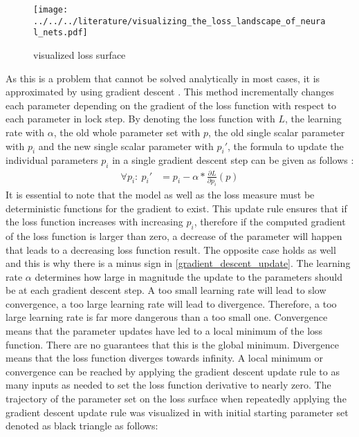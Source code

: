 \documentclass[draft,final]{vutinfth} %
\begin{document}
    \begin{figure}[H]
        \centering{}
        \texttt{[image: ../../../literature/visualizing\_the\_loss\_landscape\_of\_neural\_nets.pdf]}
        \caption{visualized loss surface \cite[p. 1]{loss_vis}}
        \label{fig:loss_vis}
    \end{figure}
    As this is a problem that cannot be solved analytically in most cases, it is approximated by using gradient descent \cite{GradientDescent}.
    This method incrementally changes each parameter depending on the gradient of the loss function with respect to each parameter in lock step.
    By denoting the loss function with $L$, the learning rate with $\alpha$, the old whole parameter set with $p$, the old single scalar parameter with $p_i$ and the new single scalar parameter with $p_i'$, the formula to update the individual parameters $p_i$ in a single gradient descent step can be given as follows \cite{GradientDescent}:
    \begin{align} 
        \label{gradient_descent_update}
        \forall p_i:~p_i' &= p_i - \alpha * \frac{\partial{L}}{\partial{p_i}}(p)
    \end{align}
    It is essential to note that the model as well as the loss measure must be deterministic functions for the gradient to exist.
    This update rule ensures that if the loss function increases with increasing $p_i$, therefore if the computed gradient of the loss function is larger than zero, a decrease of the parameter will happen that leads to a decreasing loss function result.
    The opposite case holds as well and this is why there is a minus sign in \ref{gradient_descent_update}.
    The learning rate $\alpha$ determines how large in magnitude the update to the parameters should be at each gradient descent step.
    A too small learning rate will lead to slow convergence, a too large learning rate will lead to divergence.
    Therefore, a too large learning rate is far more dangerous than a too small one.
    Convergence means that the parameter updates have led to a local minimum of the loss function.
    There are no guarantees that this is the global minimum. Divergence means that the loss function diverges towards infinity.
    A local minimum or convergence can be reached by applying the gradient descent update rule to as many inputs as needed to set the loss function derivative to nearly zero. 
    The trajectory of the parameter set on the loss surface when repeatedly applying the gradient descent update rule was visualized in \cite[p. 2]{gradient_descent_vis} with initial starting parameter set denoted as black triangle as follows:
\end{document}
